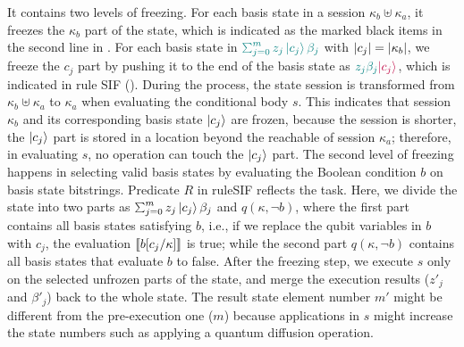 It contains two levels of freezing. For each basis state in a session $\kappa_b\uplus \kappa_a$, it freezes the $\kappa_b$ part of the state, which is indicated as the marked black items in the second line in .
 For each basis state in $\textcolor{teal}{\scha{m}{z_j}{c_{j}}{\beta_j}}$ with $|c_{j}| = |\kappa_b|$, we freeze the $c_{j}$ part by pushing it to the end of the basis state as $\textcolor{teal}{z_j\beta_j}\textcolor{purple}{\left\vert{c_{j}}\right\rangle}$, which is indicated in rule \textsc{SIF} (). 
During the process, the state session is transformed from $\kappa_b\uplus \kappa_a$ to $\kappa_a$ when evaluating the conditional body $s$. This indicates that session $\kappa_b$ and its corresponding basis state $\left\vert{c_{j}}\right\rangle$ are frozen, because the session is shorter, the $\left\vert{c_{j}}\right\rangle$ part is stored in a location beyond the reachable of session $\kappa_a$; therefore, in evaluating $s$, no operation can touch the $\left\vert{c_{j}}\right\rangle$ part.
The second level of freezing happens in selecting valid basis states by evaluating the Boolean condition $b$ on basis state bitstrings. Predicate $R$ in rule\textsc{SIF} reflects the task.
Here, we divide the state into two parts as $\scha{m}{z_j}{c_{j}}{\beta_j}$ and $q(\kappa,\neg b)$, where the first part contains all basis states satisfying $b$, i.e., if we replace the qubit variables in $b$ with $c_{j}$, the evaluation $\llbracket b[c_{j}/\kappa] \rrbracket$ is true; while the second part $q(\kappa,\neg b)$ contains all basis states that evaluate $b$ to false.
After the freezing step, we execute $s$ only on the selected unfrozen parts of the state, and merge the execution results ($z'_j$ and $\beta'_j$) back to the whole state.
The result state element number $m'$ might be different from the pre-execution one ($m$) because applications in $s$ might increase the state numbers such as applying a quantum diffusion operation.

